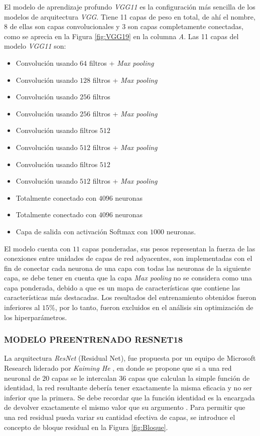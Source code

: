 El modelo de aprendizaje profundo \textit{VGG11} es la configuración más sencilla de los modelos de arquitectura \textit{VGG}. Tiene 11 capas de peso en total, de ahí el nombre, 8 de ellas son capas convolucionales y 3 son capas completamente conectadas, como se aprecia en la Figura \ref{fig:VGG19} en la columna \textit{A}. Las 11 capas del modelo \textit{VGG11} son:
\begin{itemize}
	\item Convolución usando $64$ filtros + \textit{Max pooling}
	\item Convolución usando $128$ filtros + \textit{Max pooling}
	\item Convolución usando $256$ filtros
	\item Convolución usando $256$ filtros + \textit{Max pooling}
	\item Convolución usando filtros $512$
	\item Convolución usando $512$ filtros + \textit{Max pooling}
	\item Convolución usando filtros $512$
	\item Convolución usando $512$ filtros + \textit{Max pooling}
	\item Totalmente conectado con $4096$ neuronas
	\item Totalmente conectado con $4096$ neuronas
	\item Capa de salida con activación Softmax con $1000$ neuronas.
\end{itemize}

El modelo cuenta con $11$ capas ponderadas, sus pesos representan la fuerza de las conexiones entre unidades de capas de red adyacentes, son implementadas con el fin de conectar cada neurona de una capa con todas las neuronas de la siguiente capa, se debe tener en cuenta que la capa \textit{Max pooling} no se considera como una capa ponderada, debido a que es un mapa de características que contiene las características más destacadas. Los resultados del entrenamiento obtenidos fueron inferiores al $15\%$, por lo tanto, fueron excluidos en el análisis sin optimización de los hiperparámetros.

\subsubsection{\MakeUppercase{Modelo preentrenado RESNET18}}
La arquitectura \textit{ResNet} (Residual Net), fue propuesta por un equipo de Microsoft Research liderado por \textit{Kaiming He} \cite{he2016deep}, en donde se propone que si a una red neuronal de $20$ capas se le intercalan $36$ capas que calculan la simple función de identidad, la red resultante debería tener exactamente la misma eficacia y no ser inferior que la primera. Se debe recordar que la función identidad es la encargada de devolver exactamente el mismo valor que su argumento \cite{ref_4}. Para permitir que una red residual pueda variar su cantidad efectiva de capas, se introduce el concepto de bloque residual en la Figura \ref{fig:Bloque}.

